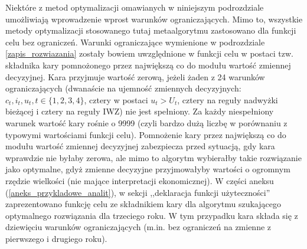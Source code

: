 Niektóre z metod optymalizacji omawianych w niniejszym podrozdziale umożliwiają wprowadzenie wprost warunków ograniczających. Mimo to, wszystkie metody optymalizacji stosowanego tutaj metaalgorytmu zastosowano dla funkcji celu bez ograniczeń. Warunki ograniczające wymienione w podrozdziale \ref{zapis_rozwiazania} zostały bowiem uwzględnione w funkcji celu w postaci tzw. składnika kary pomnożonego przez największą co do modułu wartość zmiennej decyzyjnej. Kara przyjmuje wartość zerową, jeżeli żaden z 24 warunków ograniczających (dwanaście na ujemność zmiennych decyzyjnych: $c_{t}, i_{t}, u_{t}, t \in \{1,2,3,4\}$, cztery w postaci $u_{t} > U_{t}$, cztery na reguły nadwyżki bieżącej i cztery na reguły IWZ) nie jest spełniony. Za każdy niespełniony warunek wartość kary rośnie o 9999 (czyli bardzo dużą liczbę w porównaniu z typowymi wartościami funkcji celu). Pomnożenie kary przez największą co do modułu wartość zmiennej decyzyjnej zabezpiecza przed sytuacją, gdy kara wprawdzie nie byłaby zerowa, ale mimo to algorytm wybierałby takie rozwiązanie jako optymalne, gdyż zmienne decyzyjne przyjmowałyby wartości o ogromnym rzędzie wielkości (nie mające interpretacji ekonomicznej). W części aneksu (\ref{aneks_przykladowe_analit}), w sekcji ,,deklaracja funkcji użyteczności'' zaprezentowano funkcję celu ze składnikiem kary dla algorytmu szukającego optymalnego rozwiązania dla trzeciego roku. W tym przypadku kara składa się z dziewięciu warunków ograniczających (m.in. bez ograniczeń na zmienne z pierwszego i drugiego roku). 
